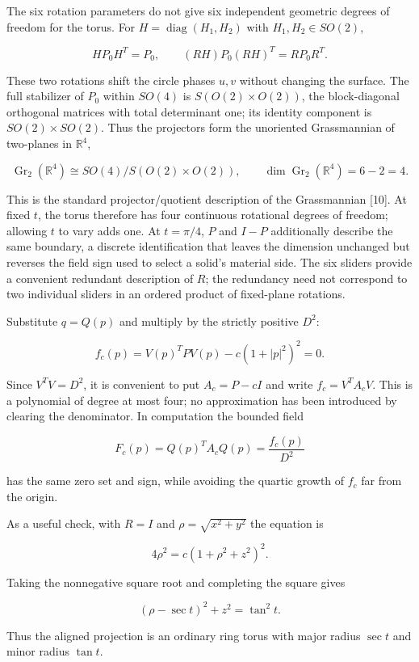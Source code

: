 \documentclass[11pt,a4paper]{article}
\begin{document}
The six rotation parameters do not give six independent geometric
degrees of freedom for the torus. For \(H=\operatorname{diag}(H_1,H_2)\)
with \(H_1,H_2\in SO(2)\),

\[
HP_0H^T=P_0,\qquad (RH)P_0(RH)^T=RP_0R^T.
\]

These two rotations shift the circle phases \(u,v\) without changing the
surface. The full stabilizer of \(P_0\) within \(SO(4)\) is
\(S(O(2)\times O(2))\), the block-diagonal orthogonal matrices with
total determinant one; its identity component is \(SO(2)\times SO(2)\).
Thus the projectors form the unoriented Grassmannian of two-planes in
\(\mathbb R^4\),

\[
\operatorname{Gr}_2(\mathbb R^4)\cong SO(4)/S(O(2)\times O(2)),\qquad
\dim\operatorname{Gr}_2(\mathbb R^4)=6-2=4.
\]

This is the standard projector/quotient description of the Grassmannian
{[}10{]}. At fixed \(t\), the torus therefore has four continuous
rotational degrees of freedom; allowing \(t\) to vary adds one. At
\(t=\pi/4\), \(P\) and \(I-P\) additionally describe the same boundary,
a discrete identification that leaves the dimension unchanged but
reverses the field sign used to select a solid's material side. The six
sliders provide a convenient redundant description of \(R\); the
redundancy need not correspond to two individual sliders in an ordered
product of fixed-plane rotations.

Substitute \(q=Q(p)\) and multiply by the strictly positive \(D^2\):

\[
\boxed{f_c(p)=V(p)^TPV(p)-c(1+|p|^2)^2=0.}
\]

Since \(V^TV=D^2\), it is convenient to put \(A_c=P-cI\) and write
\(f_c=V^TA_cV\). This is a polynomial of degree at most four; no
approximation has been introduced by clearing the denominator. In
computation the bounded field

\[
F_c(p)=Q(p)^TA_cQ(p)=\frac{f_c(p)}{D^2}
\]

has the same zero set and sign, while avoiding the quartic growth of
\(f_c\) far from the origin.

As a useful check, with \(R=I\) and \(\rho=\sqrt{x^2+y^2}\) the equation
is

\[
4\rho^2=c(1+\rho^2+z^2)^2.
\]

Taking the nonnegative square root and completing the square gives

\[
(\rho-\sec t)^2+z^2=\tan^2t.
\]

Thus the aligned projection is an ordinary ring torus with major radius
\(\sec t\) and minor radius \(\tan t\).
\end{document}

